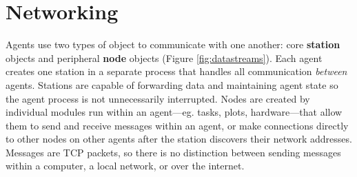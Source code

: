 \section{Networking}
\label{sec:networking}


Agents use two types of object to communicate with one another: core \textbf{station} objects and peripheral \textbf{node} objects (Figure \ref{fig:datastreams}). Each agent creates one station in a separate process that handles all communication \textit{between} agents. Stations are capable of forwarding data and maintaining agent state so the agent process is not unnecessarily interrupted. Nodes are created by individual modules run within an agent---eg. tasks, plots, hardware---that allow them to send and receive messages within an agent, or make connections directly to other nodes on other agents after the station discovers their network addresses. Messages are TCP packets, so there is no distinction between sending messages within a computer, a local network, or over the internet.


